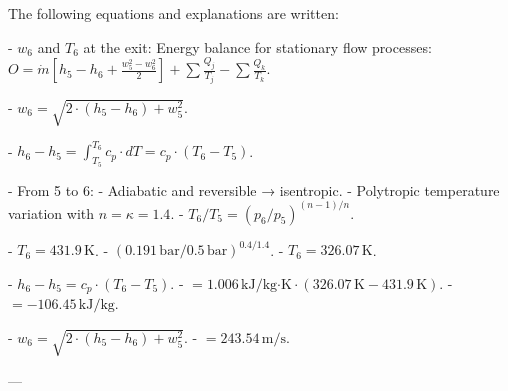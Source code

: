The following equations and explanations are written:  

- \( w_6 \) and \( T_6 \) at the exit:  
  Energy balance for stationary flow processes:  
  \( O = \dot{m} \left[ h_5 - h_6 + \frac{w_5^2 - w_6^2}{2} \right] + \sum \frac{Q_j}{T_j} - \sum \frac{Q_k}{T_k} \).  

- \( w_6 = \sqrt{2 \cdot (h_5 - h_6) + w_5^2} \).  

- \( h_6 - h_5 = \int_{T_5}^{T_6} c_p \cdot dT = c_p \cdot (T_6 - T_5) \).  

- From 5 to 6:  
  - Adiabatic and reversible → isentropic.  
  - Polytropic temperature variation with \( n = \kappa = 1.4 \).  
  - \( T_6 / T_5 = (p_6 / p_5)^{(n-1)/n} \).  

- \( T_6 = 431.9 \, \text{K} \).  
  - \( (0.191 \, \text{bar} / 0.5 \, \text{bar})^{0.4/1.4} \).  
  - \( T_6 = 326.07 \, \text{K} \).  

- \( h_6 - h_5 = c_p \cdot (T_6 - T_5) \).  
  - \( = 1.006 \, \text{kJ/kg·K} \cdot (326.07 \, \text{K} - 431.9 \, \text{K}) \).  
  - \( = -106.45 \, \text{kJ/kg} \).  

- \( w_6 = \sqrt{2 \cdot (h_5 - h_6) + w_5^2} \).  
  - \( = 243.54 \, \text{m/s} \).  

---